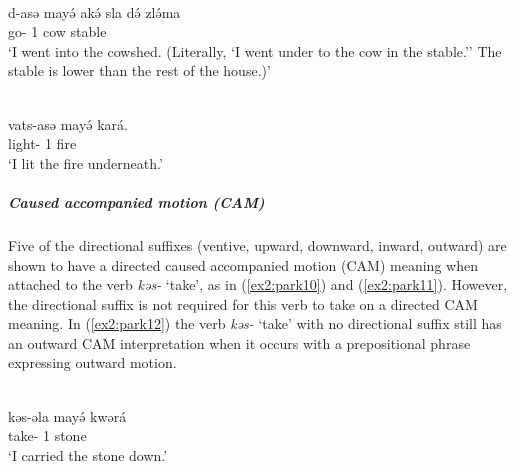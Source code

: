 \ea\label{ex2:park8}
 \\
\gll d-asə mayə́ akə́ sla də́ zlə́ma \\
go- 1  cow  stable	\\
\glt `I went into the cowshed. (Literally, `I went under to the cow in the stable.'' The stable is lower than the rest of the house.)'

\ex\label{ex2:park9}
 \\
\gll vats-asə mayə́ kará. \\
light- 1 fire \\
\glt `I lit the fire underneath.'
\z 



\subparagraph{Caused accompanied motion (CAM)}

Five of the directional suffixes (ventive, upward, downward, inward, outward) are shown to have a directed caused accompanied motion (CAM) meaning when attached to the verb \textit{kəs-} `take', as in (\ref{ex2:park10}) and (\ref{ex2:park11}). However, the directional suffix is not required for this verb to take on a directed CAM meaning. In (\ref{ex2:park12}) the verb \textit{kəs-} `take' with no directional suffix still has an outward CAM interpretation when it occurs with a prepositional phrase expressing outward motion. 

\ea\label{ex2:park10}
 \\
\gll kəs-əla mayə́ kwərá \\
take- 1 stone	\\
\glt `I carried the stone down.'


